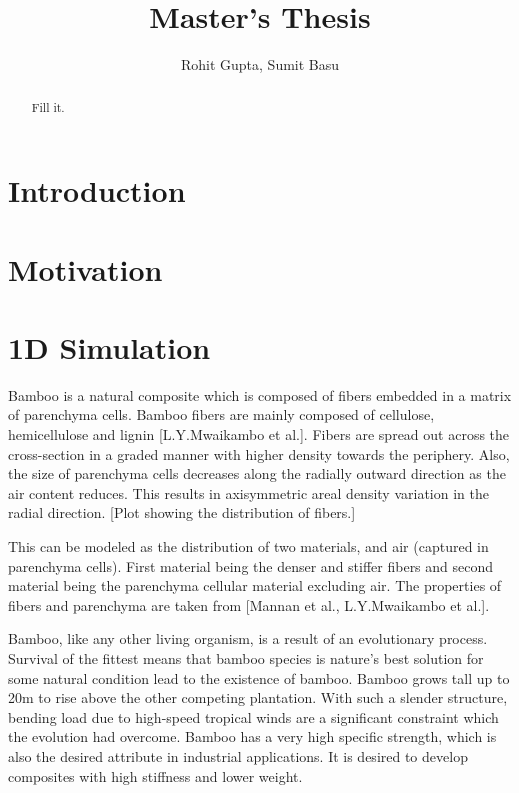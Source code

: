 \documentclass[10pt]{article}
\begin{document}
\title{Master's Thesis}
\author{Rohit Gupta, Sumit Basu}

\maketitle

\tableofcontents

\listoffigures

\listoftables

\begin{abstract}
Fill it.
\end{abstract}
\newpage
\section{Introduction}

\newpage
\section{Motivation}
\newpage
\section{1D Simulation}
Bamboo is a natural composite which is composed of fibers embedded in a matrix of parenchyma cells. Bamboo fibers are mainly composed of cellulose, hemicellulose and lignin [L.Y.Mwaikambo et al.]. Fibers are spread out across the cross-section in a graded manner with higher density towards the periphery. Also, the size of parenchyma cells decreases along the radially outward direction as the air content reduces. This results in axisymmetric areal density variation in the radial direction. [Plot showing the distribution of fibers.]\par 
This can be modeled as the distribution of two materials, and air (captured in parenchyma cells). First material being the denser and stiffer fibers and second material being the parenchyma cellular material excluding air. The properties of fibers and parenchyma are taken from [Mannan et al., L.Y.Mwaikambo et al.]. \par
Bamboo, like any other living organism, is a result of an evolutionary process. Survival of the fittest means that bamboo species is nature's best solution for some natural condition lead to the existence of bamboo. Bamboo grows tall up to 20m to rise above the other competing plantation. With such a slender structure, bending load due to high-speed tropical winds are a significant constraint which the evolution had overcome. Bamboo has a very high specific strength, which is also the desired attribute in industrial applications. It is desired to develop composites with high stiffness and lower weight.\par 
\end{document}
